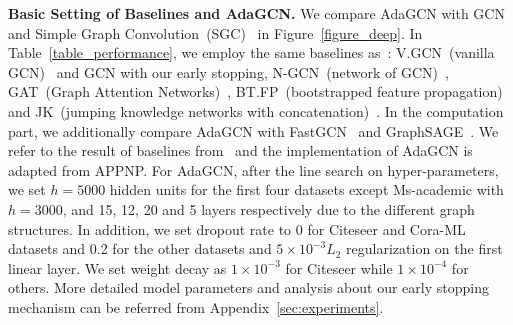 \documentclass{article} \usepackage{iclr2021_conference,times}
\begin{document}
\textbf{Basic Setting of Baselines and AdaGCN.} We compare AdaGCN with GCN~\citep{kipf2016semi} and Simple Graph Convolution~(SGC)~\citep{wu2019simplifying} in Figure~\ref{figure_deep}. In Table~\ref{table_performance}, we employ the same baselines as~\citep{klicpera2018predict}:  V.GCN~(vanilla GCN)~\citep{kipf2016semi} and GCN with our early stopping, N-GCN~(network of GCN)~\citep{abu2018n}, GAT~(Graph Attention Networks)~\citep{velivckovic2017graph}, BT.FP~(bootstrapped feature propagation)~\citep{buchnik2018bootstrapped} and JK~(jumping knowledge networks with concatenation)~\citep{xu2018representation}. In the computation part, we additionally compare AdaGCN with FastGCN~\citep{chen2018fastgcn} and GraphSAGE~\citep{hamilton2017inductive}. We refer to the result of baselines from~\citep{klicpera2018predict} and the implementation of AdaGCN is adapted from APPNP. For AdaGCN, after the line search on hyper-parameters, we set $h=5000$ hidden units for the first four datasets except Ms-academic with $h=3000$, and 15, 12, 20 and 5 layers respectively due to the different graph structures. In addition, we set dropout rate to 0 for Citeseer and Cora-ML datasets and 0.2 for the other datasets and $5\times10^{-3} L_2$ regularization on the first linear layer. We set weight decay as $1\times 10^{-3}$ for Citeseer while $1\times 10^{-4}$ for others. More detailed model parameters and analysis about our early stopping mechanism can be referred from Appendix~\ref{sec:experiments}.
\end{document}

